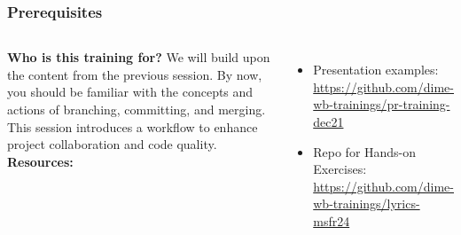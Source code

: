 \documentclass[aspectratio=169]{beamer}
\newcommand{\trainingURL}[1]{{\color{blue}\url{#1}}}
\newcommand{\exerciseURL}[1]{{\color{blue}\url{#1}}}
\newcommand{\trainingRepoURL}{\href{https://github.com/dime-wb-trainings/pr-training-dec21}
{\trainingURL{https://github.com/dime-wb-trainings/pr-training-dec21}}}
\newcommand{\exerciseRepoURL}{\href{https://github.com/dime-wb-trainings/lyrics-msfr24}{\exerciseURL{https://github.com/dime-wb-trainings/lyrics-msfr24}}}
\begin{document}
\begin{frame}
	\frametitle{Prerequisites}
	\begin{columns}[c]
	\textbf{Who is this training for?}
We will build upon the content from the previous session. By now, you should be familiar with the concepts and actions of branching, committing, and merging. This session introduces a workflow to enhance project collaboration and code quality.
		\newline
		\newline
		\textbf{Resources:}
		\begin{itemize}
			\item Presentation examples: \trainingRepoURL{}
			\item Repo for Hands-on Exercises: \exerciseRepoURL{}
		\end{itemize}
		

\end{columns}
\end{frame}
\end{document}
